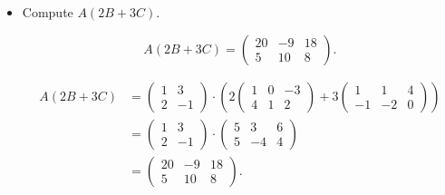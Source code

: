 \begin{Exercise}
	\begin{itemize}
		\item Compute $A(2B+3C)$.
		\begin{answer}
			$$
			A(2B+3C) = \begin{pmatrix}
			20 & -9 & 18 \\
			5 & 10 & 8
			\end{pmatrix}.
			$$
		\end{answer}
		\begin{solution}
			\begin{align*}
			A(2B+3C)
			&= \begin{pmatrix}
			1 & 3 \\
			2 & -1
			\end{pmatrix} \cdot \left( 2\begin{pmatrix}
			1 & 0 & -3 \\
			4 & 1 & 2
			\end{pmatrix} + 3\begin{pmatrix}
			1 & 1 & 4 \\
			-1 & -2 & 0
			\end{pmatrix} \right) \\
			&= \begin{pmatrix}
			1 & 3 \\
			2 & -1
			\end{pmatrix} \cdot \begin{pmatrix}
			5 & 3 & 6 \\
			5 & -4 & 4
			\end{pmatrix} \\
			&= \begin{pmatrix}
			20 & -9 & 18 \\
			5 & 10 & 8
			\end{pmatrix}.
			\end{align*}
		\end{solution}
		

\end{itemize}
\end{Exercise}
